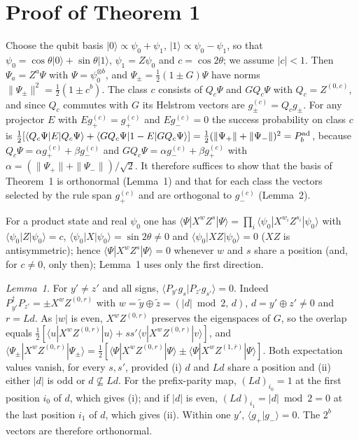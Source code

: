 \documentclass[aps,pra,twocolumn,superscriptaddress,nofootinbib]{revtex4-2}
\begin{document}
\section{Proof of Theorem 1}\label{app:A}
Choose the qubit basis $|0\rangle\propto\psi_0+\psi_1$, $|1\rangle\propto\psi_0-\psi_1$, so that $\psi_0=\cos\theta|0\rangle+\sin\theta|1\rangle$, $\psi_1=Z\psi_0$ and $c=\cos2\theta$; we assume $|c|<1$. Then $\Psi_a=Z^a\Psi$ with $\Psi=\psi_0^{\otimes b}$, and $\Psi_\pm=\tfrac12(1\pm G)\Psi$ have norms $\|\Psi_\pm\|^2=\tfrac12(1\pm c^b)$. The class $c$ consists of $Q_c\Psi$ and $GQ_c\Psi$ with $Q_c=Z^{(0,c)}$, and since $Q_c$ commutes with $G$ its Helstrom vectors are $g^{(c)}_\pm=Q_cg_\pm$. For any projector $E$ with $Eg^{(c)}_+=g^{(c)}_+$ and $Eg^{(c)}_-=0$ the success probability on class $c$ is $\tfrac12[\langle Q_c\Psi|E|Q_c\Psi\rangle+\langle GQ_c\Psi|1-E|GQ_c\Psi\rangle]=\tfrac12(\|\Psi_+\|+\|\Psi_-\|)^2=P^{\rm ad}_b$, because $Q_c\Psi=\alpha g^{(c)}_++\beta g^{(c)}_-$ and $GQ_c\Psi=\alpha g^{(c)}_-+\beta g^{(c)}_+$ with $\alpha=(\|\Psi_+\|+\|\Psi_-\|)/\sqrt2$. It therefore suffices to show that the basis of Theorem~1 is orthonormal (Lemma~1) and that for each class the vectors selected by the rule span $g^{(c)}_+$ and are orthogonal to $g^{(c)}_-$ (Lemma~2).

For a product state and real $\psi_0$ one has $\langle\Psi|X^wZ^s|\Psi\rangle=\prod_i\langle\psi_0|X^{w_i}Z^{s_i}|\psi_0\rangle$ with $\langle\psi_0|Z|\psi_0\rangle=c$, $\langle\psi_0|X|\psi_0\rangle=\sin2\theta\neq0$ and $\langle\psi_0|XZ|\psi_0\rangle=0$ ($XZ$ is antisymmetric); hence $\langle\Psi|X^wZ^s|\Psi\rangle=0$ whenever $w$ and $s$ share a position (and, for $c\neq0$, only then); Lemma~1 uses only the first direction.

\emph{Lemma~1.} For $y'\neq z'$ and all signs, $\langle P_{y'}g_s|P_{z'}g_{s'}\rangle=0$. Indeed $P_{y'}^\dagger P_{z'}=\pm X^wZ^{(0,r)}$ with $w=\tilde y\oplus\tilde z=(|d|\bmod2,\,d)$, $d=y'\oplus z'\neq0$ and $r=Ld$. As $|w|$ is even, $X^wZ^{(0,r)}$ preserves the eigenspaces of $G$, so the overlap equals $\tfrac12[\langle u|X^wZ^{(0,r)}|u\rangle+ss'\langle v|X^wZ^{(0,r)}|v\rangle]$, and $\langle\Psi_\pm|X^wZ^{(0,r)}|\Psi_\pm\rangle=\tfrac12[\langle\Psi|X^wZ^{(0,r)}|\Psi\rangle\pm\langle\Psi|X^wZ^{(1,\bar r)}|\Psi\rangle]$. Both expectation values vanish, for every $s,s'$, provided (i) $d$ and $Ld$ share a position and (ii) either $|d|$ is odd or $d\not\subseteq Ld$. For the prefix-parity map, $(Ld)_{i_0}=1$ at the first position $i_0$ of $d$, which gives (i); and if $|d|$ is even, $(Ld)_{i_1}=|d|\bmod2=0$ at the last position $i_1$ of $d$, which gives (ii). Within one $y'$, $\langle g_+|g_-\rangle=0$. The $2^b$ vectors are therefore orthonormal.
\end{document}
